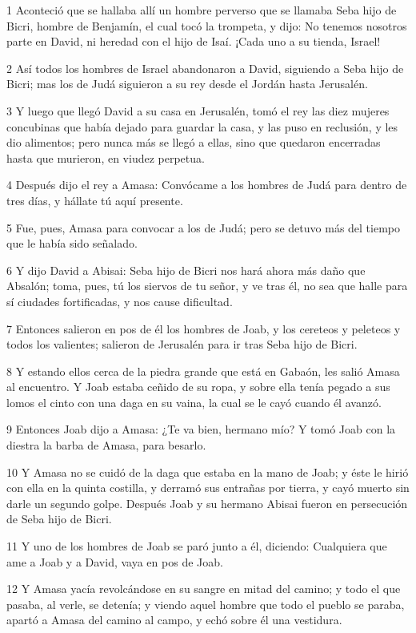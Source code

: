 \par 1 Aconteció que se hallaba allí un hombre perverso que se llamaba Seba hijo de Bicri, hombre de Benjamín, el cual tocó la trompeta, y dijo: No tenemos nosotros parte en David, ni heredad con el hijo de Isaí. ¡Cada uno a su tienda, Israel! 
\par 2 Así todos los hombres de Israel abandonaron a David, siguiendo a Seba hijo de Bicri; mas los de Judá siguieron a su rey desde el Jordán hasta Jerusalén.
\par 3 Y luego que llegó David a su casa en Jerusalén, tomó el rey las diez mujeres concubinas que había dejado para guardar la casa, y las puso en reclusión, y les dio alimentos; pero nunca más se llegó a ellas, sino que quedaron encerradas hasta que murieron, en viudez perpetua.
\par 4 Después dijo el rey a Amasa: Convócame a los hombres de Judá para dentro de tres días, y hállate tú aquí presente.
\par 5 Fue, pues, Amasa para convocar a los de Judá; pero se detuvo más del tiempo que le había sido señalado.
\par 6 Y dijo David a Abisai: Seba hijo de Bicri nos hará ahora más daño que Absalón; toma, pues, tú los siervos de tu señor, y ve tras él, no sea que halle para sí ciudades fortificadas, y nos cause dificultad.
\par 7 Entonces salieron en pos de él los hombres de Joab, y los cereteos y peleteos y todos los valientes; salieron de Jerusalén para ir tras Seba hijo de Bicri.
\par 8 Y estando ellos cerca de la piedra grande que está en Gabaón, les salió Amasa al encuentro. Y Joab estaba ceñido de su ropa, y sobre ella tenía pegado a sus lomos el cinto con una daga en su vaina, la cual se le cayó cuando él avanzó.
\par 9 Entonces Joab dijo a Amasa: ¿Te va bien, hermano mío? Y tomó Joab con la diestra la barba de Amasa, para besarlo.
\par 10 Y Amasa no se cuidó de la daga que estaba en la mano de Joab; y éste le hirió con ella en la quinta costilla, y derramó sus entrañas por tierra, y cayó muerto sin darle un segundo golpe. Después Joab y su hermano Abisai fueron en persecución de Seba hijo de Bicri.
\par 11 Y uno de los hombres de Joab se paró junto a él, diciendo: Cualquiera que ame a Joab y a David, vaya en pos de Joab.
\par 12 Y Amasa yacía revolcándose en su sangre en mitad del camino; y todo el que pasaba, al verle, se detenía; y viendo aquel hombre que todo el pueblo se paraba, apartó a Amasa del camino al campo, y echó sobre él una vestidura.
